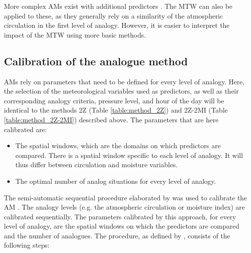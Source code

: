 \documentclass[hess, manuscript]{copernicus}
\begin{document}
	More complex AMs exist with additional predictors \citep[see e.g.][]{Horton2012a, BenDaoud2016, Caillouet2016}. The MTW can also be applied to these, as they generally rely on a similarity of the atmospheric circulation in the first level of analogy. However, it is easier to interpret the impact of the MTW using more basic methods.
	
	
	\subsection{Calibration of the analogue method}
	\label{sec:calibration}
	
	AMs rely on parameters that need to be defined for every level of analogy. Here, the selection of the meteorological variables used as predictors, as well as their corresponding analogy criteria, pressure level, and hour of the day will be identical to the methods 2Z (Table \ref{table:method_2Z}) and 2Z-2MI (Table \ref{table:method_2Z-2MI}) described above. The parameters that are here calibrated are:
	
	\begin{itemize}
		\item The spatial windows, which are the domains on which predictors are compared. There is a spatial window specific to each level of analogy. It will thus differ between circulation and moisture variables.
		\item The optimal number of analog situations for every level of analogy.
	\end{itemize}
	
	The semi-automatic sequential procedure elaborated by \citet{Bontron2004} was used to calibrate the AM \cite[see also ][]{Radanovics2013, BenDaoud2016}. The analogy levels (e.g. the atmospheric circulation or moisture index) are calibrated sequentially. The parameters calibrated by this approach, for every level of analogy, are the spatial windows on which the predictors are compared and the number of analogues. The procedure, as defined by \citet{Bontron2004}, consists of the following steps:
	
\end{document}
